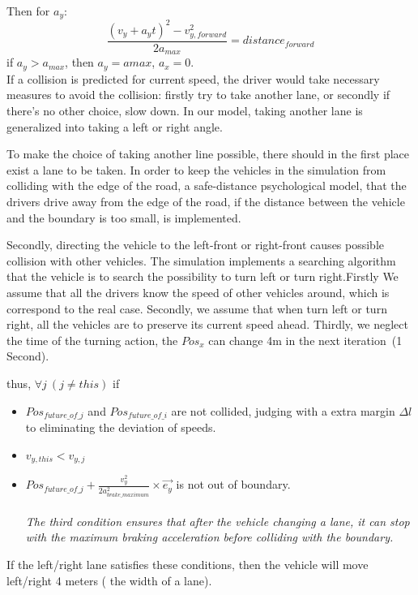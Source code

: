 \documentclass{mcmthesis}
\begin{document}
Then for $a_y$:
$$\frac{(v_y+a_yt)^2-v_{y,forward}^2}{2a_{max}}=distance_{forward}$$
if $a_y>a_{max}$, then $a_y=a{max}$, $a_x=0$.\\

If a collision is predicted for current speed, the driver would take necessary measures to avoid the collision: firstly try to take another lane, or secondly if there's no other choice, slow down. In our model, taking another lane is generalized into taking a left or right angle.

To make the choice of taking another line possible, there should in the first place exist a lane to be taken. In order to keep the vehicles in the simulation from colliding with the edge of the road, a safe-distance psychological model, that the drivers drive away from the edge of the road, if the distance between the vehicle and the boundary is too small, is implemented. 

Secondly, directing the vehicle to the left-front or right-front causes possible collision with other vehicles. The simulation implements a searching algorithm that the vehicle is to search the possibility to turn left or turn right.Firstly We assume that all the drivers know the speed of other vehicles around, which is correspond to the real case. Secondly, we assume that when turn left or turn right, all the vehicles are to preserve its current speed ahead. Thirdly, we neglect the time of the turning action, the $Pos_x$ can change 4m in the next iteration\ (1 Second).

thus, $\forall j\ (j \neq this) $ if
\begin{itemize}
\setlength{\itemindent}{2em}
		\item $Pos_{future \_of \_j}$ and $ Pos_{future \_of \_i}$ are not collided, judging with a extra margin $\Delta l$ to eliminating the deviation of speeds.
		\item $v_{y,this} < v_{y,j} $
		\item $Pos_{future \_ of \_ j} + \frac{v_y^2}{2a_{brake \_ maximum}^2} \times \overrightarrow{e_y}$ is not out of boundary.
		\\ \\ \emph{The third condition ensures that after the vehicle changing a lane, it can stop with the maximum braking acceleration before colliding with the boundary. }
\end{itemize}

If the left/right lane satisfies these conditions, then the vehicle will move left/right 4 meters ( the width of a lane).
\end{document}
